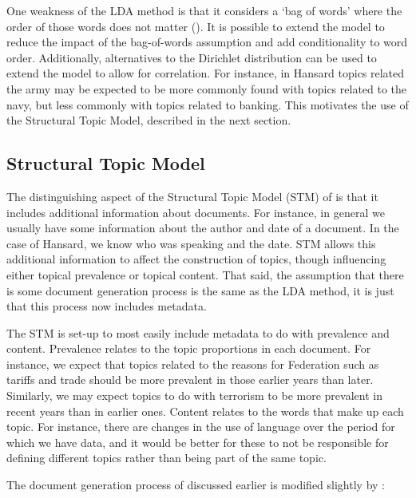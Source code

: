 \documentclass[12pt,]{article}
\theoremstyle{definition}
\theoremstyle{definition}
\theoremstyle{definition}
\theoremstyle{remark}
\begin{document}
One weakness of the LDA method is that it considers a `bag of words'
where the order of those words does not matter (\citet{blei2012}). It is
possible to extend the model to reduce the impact of the bag-of-words
assumption and add conditionality to word order. Additionally,
alternatives to the Dirichlet distribution can be used to extend the
model to allow for correlation. For instance, in Hansard topics related
the army may be expected to be more commonly found with topics related
to the navy, but less commonly with topics related to banking. This
motivates the use of the Structural Topic Model, described in the next
section.

\subsection{Structural Topic Model}\label{structural-topic-model}

The distinguishing aspect of the Structural Topic Model (STM) of
\citet{RobertsStewartAiroldi2016} is that it includes additional
information about documents. For instance, in general we usually have
some information about the author and date of a document. In the case of
Hansard, we know who was speaking and the date. STM allows this
additional information to affect the construction of topics, though
influencing either topical prevalence or topical content. That said, the
assumption that there is some document generation process is the same as
the LDA method, it is just that this process now includes metadata.

The STM is set-up to most easily include metadata to do with prevalence
and content. Prevalence relates to the topic proportions in each
document. For instance, we expect that topics related to the reasons for
Federation such as tariffs and trade should be more prevalent in those
earlier years than later. Similarly, we may expect topics to do with
terrorism to be more prevalent in recent years than in earlier ones.
Content relates to the words that make up each topic. For instance,
there are changes in the use of language over the period for which we
have data, and it would be better for these to not be responsible for
defining different topics rather than being part of the same topic.

The document generation process of \citet{Blei2003latent} discussed
earlier is modified slightly by \citet{RobertsStewartAiroldi2016}:
\end{document}
